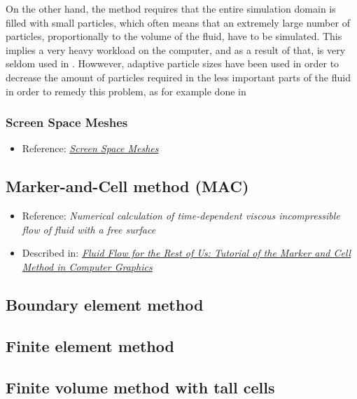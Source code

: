 On the other hand, the \SPH method requires that the entire simulation domain is filled with small particles, which often means that an extremely large number of particles, proportionally to the volume of the fluid, have to be simulated. This implies a very heavy workload on the computer, and as a result of that, \SPH is very seldom used in . Howwever, adaptive particle sizes have been used in order to decrease the amount of particles required in the less important parts of the fluid in order to remedy this problem, as for example done in 

\subsubsection{Screen Space Meshes}

\begin{itemize}
    \item Reference: \textit{\href{http://www.matthiasmueller.info/publications/screenSpaceMeshes.pdf}{Screen Space Meshes}}
\end{itemize}

\subsection{Marker-and-Cell method (MAC)}

\begin{itemize}
    \item Reference: \textit{Numerical calculation of time-dependent viscous incompressible flow of fluid with a free surface}
    \item Described in: \textit{\href{http://people.sc.fsu.edu/~jburkardt/pdf/fluid_flow_for_the_rest_of_us.pdf}{Fluid Flow for the Rest of Us: Tutorial of the Marker and Cell Method in Computer Graphics}}
\end{itemize}

\subsection{Boundary element method}

\subsection{Finite element method}

\subsection{Finite volume method with tall cells}

